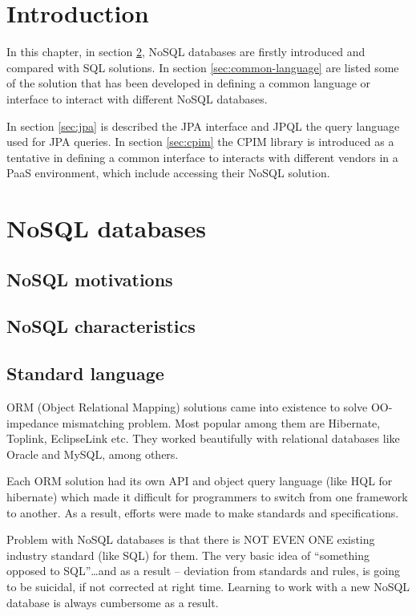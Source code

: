 \section{Introduction}
In this chapter, in section \ref{sec:nosql}, NoSQL databases are firstly introduced and compared with SQL solutions. In section \ref{sec:common-language} are listed some of the solution that has been developed in defining a common language or interface to interact with different NoSQL databases.

\noindent In section \ref{sec:jpa} is described the JPA interface and JPQL the query language used for JPA queries. In section \ref{sec:cpim} the CPIM library is introduced as a tentative in defining a common interface to interacts with different vendors in a PaaS environment, which include accessing their NoSQL solution.

\section{NoSQL databases}
\label{sec:nosql}
\subsection{NoSQL motivations}
\subsection{NoSQL characteristics}
\subsection{Standard language}
ORM (Object Relational Mapping) solutions came into existence to solve OO-impedance mismatching problem. Most popular among them are Hibernate, Toplink, EclipseLink etc. They worked beautifully with relational databases like Oracle and MySQL, among others.

Each ORM solution had its own API and object query language (like HQL for hibernate) which made it difficult for programmers to switch from one framework to another. As a result, efforts were made to make standards and specifications. 

Problem with NoSQL databases is that there is NOT EVEN ONE existing industry standard (like SQL) for them. The very basic idea of “something opposed to SQL”…and as a result – deviation from standards and rules, is going to be suicidal, if not corrected at right time. Learning to work with a new NoSQL database is always cumbersome as a result.

